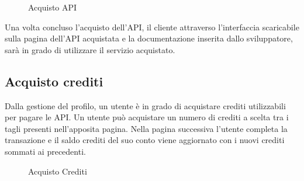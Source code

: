 \label{Acquisto API}
\begin{figure}[H]
	\centering
	\caption{Acquisto API}
\end{figure}
Una volta concluso l'acquisto dell'API, il cliente attraverso l'interfaccia scaricabile sulla pagina dell'API acquistata e la documentazione inserita dallo sviluppatore, sarà in grado di utilizzare il servizio acquistato.

\subsection{Acquisto crediti}
Dalla gestione del profilo, un utente è in grado di acquistare crediti utilizzabili per pagare le API. Un utente può acquistare un numero di crediti a scelta tra i tagli presenti nell'apposita pagina. Nella pagina successiva l'utente completa la transazione e il saldo crediti del suo conto viene aggiornato con i nuovi crediti sommati ai precedenti.

\label{Acquisto Crediti}
\begin{figure}[H]
	\centering
	\caption{Acquisto Crediti}
\end{figure}

